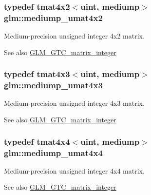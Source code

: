 \subsubsection[{mediump\+\_\+umat4x2}]{\setlength{\rightskip}{0pt plus 5cm}typedef tmat4x2$<${\bf uint}, mediump$>$ {\bf glm\+::mediump\+\_\+umat4x2}}\label{group__gtc__matrix__integer_ga9dd5ce011ca43d90cf1b94084c7e90ac}
Medium-\/precision unsigned integer 4x2 matrix. \begin{DoxySeeAlso}{See also}
\hyperlink{group__gtc__matrix__integer}{G\+L\+M\+\_\+\+G\+T\+C\+\_\+matrix\+\_\+integer} 
\end{DoxySeeAlso}
\hypertarget{group__gtc__matrix__integer_gac91ed5aa76fe160d5ab5d31e2b94d95b}{}
\subsubsection[{mediump\+\_\+umat4x3}]{\setlength{\rightskip}{0pt plus 5cm}typedef tmat4x3$<${\bf uint}, mediump$>$ {\bf glm\+::mediump\+\_\+umat4x3}}\label{group__gtc__matrix__integer_gac91ed5aa76fe160d5ab5d31e2b94d95b}
Medium-\/precision unsigned integer 4x3 matrix. \begin{DoxySeeAlso}{See also}
\hyperlink{group__gtc__matrix__integer}{G\+L\+M\+\_\+\+G\+T\+C\+\_\+matrix\+\_\+integer} 
\end{DoxySeeAlso}
\hypertarget{group__gtc__matrix__integer_ga7141a9d9f1c26521e397be34d19c1b8f}{}
\subsubsection[{mediump\+\_\+umat4x4}]{\setlength{\rightskip}{0pt plus 5cm}typedef tmat4x4$<${\bf uint}, mediump$>$ {\bf glm\+::mediump\+\_\+umat4x4}}\label{group__gtc__matrix__integer_ga7141a9d9f1c26521e397be34d19c1b8f}
Medium-\/precision unsigned integer 4x4 matrix. \begin{DoxySeeAlso}{See also}
\hyperlink{group__gtc__matrix__integer}{G\+L\+M\+\_\+\+G\+T\+C\+\_\+matrix\+\_\+integer} 
\end{DoxySeeAlso}
\hypertarget{group__gtc__matrix__integer_gae2d45c058cfa0b60ab4df0cdda2d8516}{}
